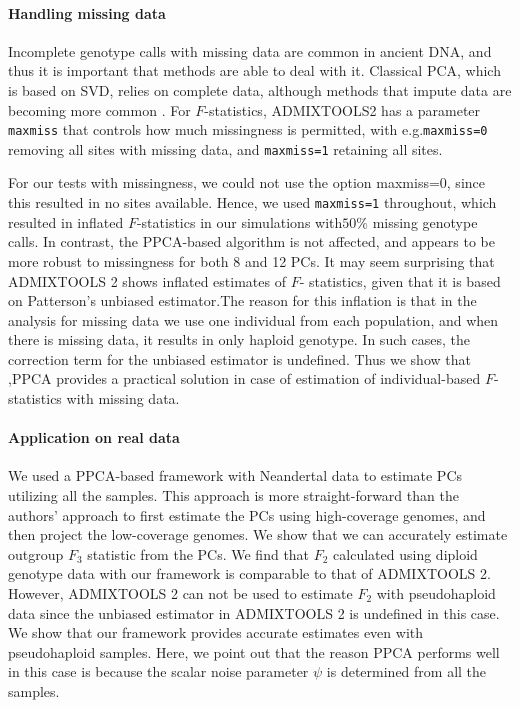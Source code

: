 \documentclass[12pt, letterpaper]{article}
\begin{document}
\paragraph{Handling missing data}
Incomplete genotype calls with missing data are common in ancient DNA, and thus it is important that methods are able to deal with it. Classical PCA, which is based on SVD, relies on complete data, although methods that impute data are becoming more common \citep{meisner_large-scale_2021}. For $F$-statistics, ADMIXTOOLS2 has a parameter \texttt{maxmiss} that controls how much missingness is permitted, with e.g.\texttt{maxmiss=0} removing all sites with missing data, and \texttt{maxmiss=1} retaining all sites.

For our tests with missingness, we could not use the option maxmiss=0, since this resulted in no sites available. Hence, we used \texttt{maxmiss=1} throughout, which resulted in inflated $F$-statistics in our simulations with$50\%$ missing genotype calls. In contrast, the  PPCA-based algorithm is not affected, and appears to be more robust to missingness for both 8 and 12 PCs. It may seem surprising that ADMIXTOOLS 2 shows inflated estimates of $F$- statistics, given that it is based on Patterson's unbiased estimator.The reason for this inflation is that in the analysis for missing data we use one individual from each population, and when there is missing data, it results in only haploid genotype. In such cases, the correction term for the unbiased estimator is undefined. Thus we show that ,PPCA provides a practical solution in case of estimation of individual-based $F$-statistics with missing data. 

\paragraph{Application on real data}
We used a PPCA-based framework with Neandertal data to estimate PCs utilizing all the samples. This approach is more straight-forward than the authors' approach to first estimate the PCs using high-coverage genomes, and then project the low-coverage genomes. We show that we can accurately estimate outgroup $F_3$ statistic from the PCs. We find that $F_2$ calculated using diploid genotype data with our framework is comparable to that of ADMIXTOOLS 2. However, ADMIXTOOLS 2 can not be used to estimate $F_2$ with pseudohaploid data since the unbiased estimator in ADMIXTOOLS 2 is undefined in this case. We show that our framework provides accurate estimates even with pseudohaploid samples. Here, we point out that the reason PPCA performs well in this case is because the scalar noise parameter $\psi$ is determined from all the samples.
\end{document}
